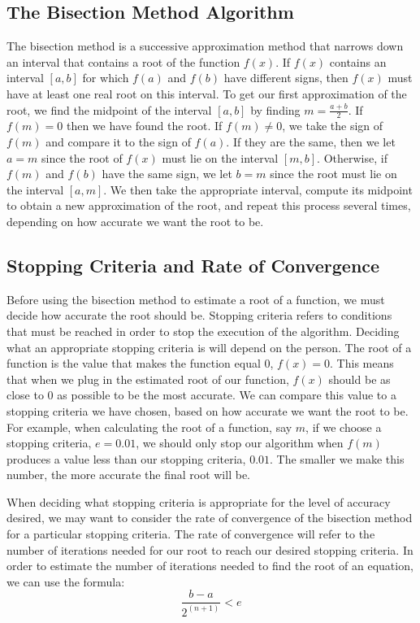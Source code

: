 \documentclass{article}
\begin{document}
\subsection{The Bisection Method Algorithm}
The bisection method is a successive approximation method that narrows down an interval that contains a root of the function $f(x)$. \cite{mathcs} If $f(x)$ contains an interval $[a,b]$ for which $f(a)$ and $f(b)$ have different signs, then $f(x)$ must have at least one real root on this interval. To get our first approximation of the root, we find the midpoint of the interval $[a,b]$ by finding $m=\frac{a+b}{2}$. If $f(m)=0$ then we have found the root. If $f(m)\ne 0$, we take the sign of $f(m)$ and compare it to the sign of $f(a)$. If they are the same, then we let $a = m$ since the root of $f(x)$ must lie on the interval $[m,b]$. Otherwise, if $f(m)$ and $f(b)$ have the same sign, we let $b=m$ since the root must lie on the interval $[a,m]$. We then take the appropriate interval, compute its midpoint to obtain a new approximation of the root, and repeat this process several times, depending on how accurate we want the root to be.

\subsection{Stopping Criteria and Rate of Convergence}
Before using the bisection method to estimate a root of a function, we must decide how accurate the root should be. Stopping criteria refers to conditions that must be reached in order to stop the execution of the algorithm.\cite{post} Deciding what an appropriate stopping criteria is will depend on the person. The root of a function is the value that makes the function equal 0, $f(x)=0$. This means that when we plug in the estimated root of our function, $f(x)$ should be as close to 0 as possible to be the most accurate. We can compare this value to a stopping criteria we have chosen, based on how accurate we want the root to be. For example, when calculating the root of a function, say $m$, if we choose a stopping criteria, $e = 0.01$, we should only stop our algorithm when $f(m)$ produces a value less than our stopping criteria, $0.01$. The smaller we make this number, the more accurate the final root will be.
\par When deciding what stopping criteria is appropriate for the level of accuracy desired, we may want to consider the rate of convergence of the bisection method for a particular stopping criteria. The rate of convergence will refer to the number of iterations needed for our root to reach our desired stopping criteria. In order to estimate the number of iterations needed to find the root of an equation, we can use the formula:
\begin{equation*}
    \frac{b-a}{2^{(n+1)}}<e
\end{equation*}
\end{document}
